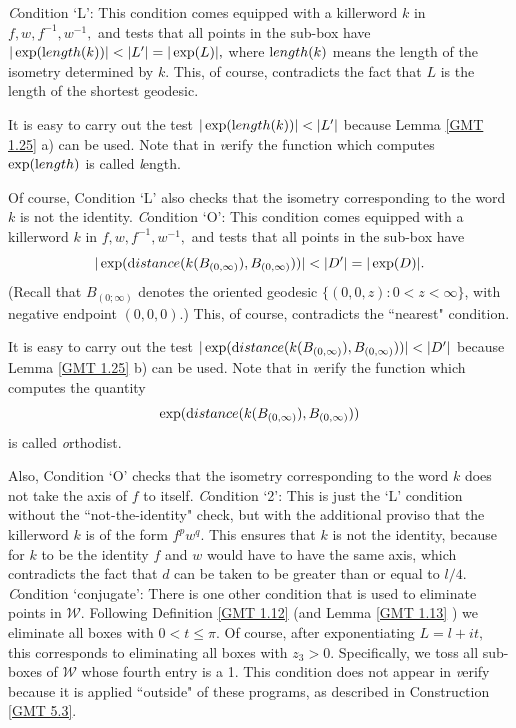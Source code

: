 \begin{the interesting conditions}\label{GMT 5.2}
{\textit Condition}  `L': This condition comes equipped with a killerword $k$ in $f, w, f^{-1}, w^{-1},$ and tests that all
points in the sub-box have $|\exp({\textrm length}(k))| <  |L^{\prime}| = |\exp(L)|,$ where ${\textrm length}(k)$ means the length
of the isometry determined by $k.$   This, of course, contradicts the fact that $L$ is the length of the shortest geodesic.

It is easy to carry out the test $|\exp({\textrm length}(k))| <  |L^{\prime}|$ because
Lemma \ref{GMT 1.25} a) can be used.
Note that in {\textit verify} the function which computes $\exp({\textrm length})$ is called {\textit length}.  

Of course, Condition `L' also checks that the isometry corresponding to the word $k$ is not the identity.
{\textit Condition}   `O':   This condition comes equipped with a killerword 
$k$ in $f, w, f^{-1}, w^{-1},$ and tests that all points in the sub-box have 
$$|\exp({\textrm distance}(k(B_{(0,\infty)}),
B_{(0,\infty)}))| <  |D^{\prime}| = |\exp(D)|.$$    (Recall that 
$B_{(0;\infty)}$ denotes the oriented geodesic $\{(0,0,z): 0< z < \infty \}$,
with negative endpoint $(0,0,0).$)
This, of course, contradicts the ``nearest" condition.

It is easy to carry out the test $|\exp({\textrm distance}(k(B_{(0,\infty)}), B_{(0,\infty)}))| <  |D^{\prime}|$ because
Lemma \ref{GMT 1.25} b) can be used. Note that in {\textit verify} the function which computes the quantity
$$\exp({\textrm distance}(k(B_{(0,\infty)}), B_{(0,\infty)}))$$ is called {\textit orthodist}.  

Also, Condition `O' checks that the isometry corresponding to the word $k$ does not take the axis of $f$ to itself.
{\textit Condition}   `2':  This is just the `L' condition without the ``not-the-identity" check, but with the additional
proviso that the killerword $k$ is of the form $f^p w^q.$ This ensures that $k$ is not the identity, because for $k$ to be
the identity $f$ and $w$ would have to have the same axis, which contradicts the fact that $d$ can be taken to be
greater than or equal to $l/4.$
\vskip 8pt
{\textit Condition}  `conjugate':  There is one other condition that is used to eliminate points in ${\mathcal W}.$  Following
Definition \ref{GMT 1.12}
 (and 
Lemma \ref{GMT 1.13}
) we eliminate all boxes with $0 < t \le \pi.$  Of course, after exponentiating $L = l+it,$
this corresponds to eliminating all boxes with $z_3 > 0.$ Specifically, we toss all sub-boxes of ${\mathcal W}$ whose fourth
entry is a 1. This condition does not appear in {\textit verify} because it is applied ``outside" of these
programs, as described in Construction \ref{GMT 5.3}.\end{the interesting conditions}
